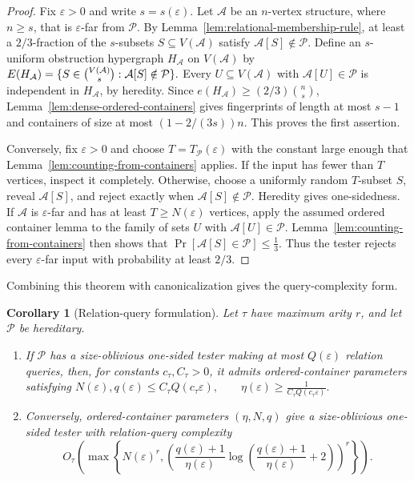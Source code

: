 \documentclass[11pt,reqno,letterpaper]{amsart}
\newcommand{\cA}{{\mathcal A}}
\newcommand{\cP}{{\mathcal P}}
\theoremstyle{plain}
\newtheorem{cor}[thm]{Corollary}
\theoremstyle{remark}
\begin{document}
\begin{proof}
Fix $\varepsilon>0$ and write $s=s(\varepsilon)$.  Let $\cA$ be an
$n$-vertex structure, where $n\geq s$, that is $\varepsilon$-far from $\cP$.
By Lemma~\ref{lem:relational-membership-rule}, at least a $2/3$-fraction of
the $s$-subsets $S\subseteq V(\cA)$ satisfy $\cA[S]\notin\cP$.  Define an
$s$-uniform obstruction hypergraph $H_{\cA}$ on $V(\cA)$ by
\(E(H_{\cA}) =\{S\in\tbinom{V(\cA)}s:\cA[S]\notin\cP\}.\)
Every $U\subseteq V(\cA)$ with $\cA[U]\in\cP$ is independent in
$H_{\cA}$, by heredity.  Since
$e(H_{\cA})\geq(2/3)\binom{n}{s}$, Lemma~\ref{lem:dense-ordered-containers}
gives fingerprints of length at most $s-1$ and containers of size at most
$(1-2/(3s))n$.  This proves the first assertion.

Conversely, fix $\varepsilon>0$ and choose $T=T_{\cP}(\varepsilon)$ with the
constant large enough that Lemma~\ref{lem:counting-from-containers} applies.
If the input has fewer than $T$ vertices, inspect it completely.  Otherwise,
choose a uniformly random $T$-subset $S$, reveal $\cA[S]$, and reject exactly
when $\cA[S]\notin\cP$.  Heredity gives one-sidedness.  If $\cA$ is
$\varepsilon$-far and has at least $T\geq N(\varepsilon)$ vertices, apply the
assumed ordered container lemma to the family of sets $U$ with
$\cA[U]\in\cP$.  Lemma~\ref{lem:counting-from-containers} then shows that
\(\Pr[\cA[S]\in\cP]\leq\frac13.\)
Thus the tester rejects every $\varepsilon$-far input with probability at
least $2/3$.
\end{proof}

Combining this theorem with canonicalization gives the query-complexity form.

\begin{cor}[Relation-query formulation]
\label{cor:relational-query-characterization}
Let $\tau$ have maximum arity $r$, and let $\cP$ be hereditary.
\begin{enumerate}
\item If $\cP$ has a size-oblivious one-sided tester making at most
$Q(\varepsilon)$ relation queries, then, for constants
$c_\tau,C_\tau>0$, it admits ordered-container parameters satisfying
\(N(\varepsilon),q(\varepsilon) \leq C_\tau Q(c_\tau\varepsilon), \qquad \eta(\varepsilon) \geq\frac{1}{C_\tau Q(c_\tau\varepsilon)}.\)

\item Conversely, ordered-container parameters $(\eta,N,q)$ give a
size-oblivious one-sided tester with relation-query complexity
\[
O_\tau\!\left(
\max\left\{
N(\varepsilon)^r,
\left(
\frac{q(\varepsilon)+1}{\eta(\varepsilon)}
\log\left(
\frac{q(\varepsilon)+1}{\eta(\varepsilon)}+2
\right)
\right)^r
\right\}
\right).
\]
\end{enumerate}
\end{cor}
\end{document}
